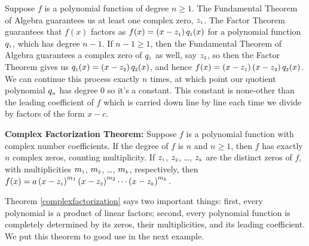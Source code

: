 Suppose  $f$ is a polynomial function of degree $n \geq 1$.  The Fundamental Theorem of Algebra guarantees us at least one complex zero, $z_{\mbox{\tiny $1$}}$.  The Factor Theorem guarantees that $f(x)$ factors as $f(x) = \left(x - z_{\mbox{\tiny $1$}}\right) q_{\mbox{\tiny $1$}}(x)$ for a polynomial function $q_{\mbox{\tiny $1$}}$,  which has degree $n-1$.  If $n-1 \geq 1$, then the Fundamental Theorem of Algebra guarantees a complex zero of $q_{\mbox{\tiny $1$}}$ as well, say $z_{\mbox{\tiny $2$}}$, so then the Factor Theorem gives us $q_{\mbox{\tiny $1$}}(x) = \left(x - z_{\mbox{\tiny $2$}}\right) q_{\mbox{\tiny $2$}}(x)$, and hence $f(x) = \left(x - z_{\mbox{\tiny $1$}}\right) \left(x - z_{\mbox{\tiny $2$}}\right) q_{\mbox{\tiny $2$}}(x)$.  We can continue this process exactly $n$ times, at which point our quotient polynomial $q_{\mbox{\tiny $n$}}$ has degree $0$ so it's a constant.  This constant is none-other than the leading coefficient of $f$ which is carried down line by line each time we divide by factors of the form $x-c$.

\begin{tcolorbox}
\begin{thm} \label{complexfactorization} \textbf{Complex Factorization Theorem:} Suppose $f$ is a polynomial function with complex number coefficients.  If the degree of $f$ is $n$ and $n \geq 1$, then  $f$ has exactly $n$ complex zeros, counting multiplicity.  If $z_{\mbox{\tiny $1$}}$, $z_{\mbox{\tiny $2$}}$, \ldots, $z_{\mbox{\tiny $k$}}$ are the distinct zeros of $f$, with multiplicities $m_{\mbox{\tiny $1$}}$, $m_{\mbox{\tiny $2$}}$, \ldots, $m_{\mbox{\tiny $k$}}$, respectively, then $f(x) = a\left(x - z_{\mbox{\tiny $1$}}  \right)^{m_{\mbox{\tiny $1$}}}\left(x - z_{\mbox{\tiny $2$}}  \right)^{m_{\mbox{\tiny $2$}}} \cdots \left(x - z_{\mbox{\tiny $k$}}  \right)^{m_{\mbox{\tiny $k$}}}$. 

\end{thm}
\end{tcolorbox}

Theorem \ref{complexfactorization} says two important things:  first, every polynomial is a product of linear factors;  second, every polynomial function is completely determined by its zeros, their multiplicities, and its leading coefficient.  We put this theorem to good use in the next example.

